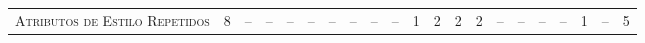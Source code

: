 \begin{table*}
\begin{tabular}{@{}p{4.2cm}p{0.3cm}p{.2cm}p{.2cm}p{.2cm}p{.2cm}p{.2cm}p{.2cm}p{.2cm}p{.2cm}p{.2cm}p{.4cm}p{.4cm}p{.4cm}p{.4cm}p{.4cm}p{.4cm}p{.4cm}p{.4cm}p{.4cm}p{0.2cm}@{}}
\textsc{Atributos de Estilo Repetidos}     	& \multicolumn{1}{c}{8} 	& \multicolumn{1}{c}{--} 	& \multicolumn{1}{c}{--} 	& \multicolumn{1}{c}{--} 	& \multicolumn{1}{c}{--} 	& \multicolumn{1}{c}{--} 	& \multicolumn{1}{c}{--} 	& \multicolumn{1}{c}{--} 	& \multicolumn{1}{c}{--} 	& \multicolumn{1}{c}{1} 	& \multicolumn{1}{c}{2} 	& \multicolumn{1}{c}{2} 	& \multicolumn{1}{c}{2} 	& \multicolumn{1}{c}{--} 	& \multicolumn{1}{c}{--} 	& \multicolumn{1}{c}{--}	& \multicolumn{1}{c}{--} 	& \multicolumn{1}{c}{1} 	& \multicolumn{1}{c}{--} 	& \multicolumn{1}{c}{5} \\


\end{tabular}
\end{table*}
